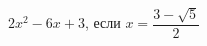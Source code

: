 \begin{ex}[type=calculate_expression]
	\begin{condition}
		\( 2x^2-6x+3 \), \quad если \( x=\dfrac{3-\sqrt{5}}{2} \)
	\end{condition}
\end{ex}